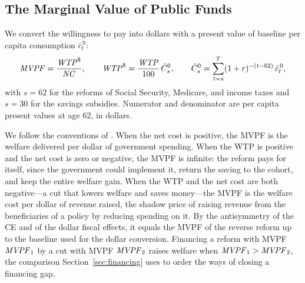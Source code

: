 \subsection{The Marginal Value of Public Funds}\label{sec:fw_mvpf}

We convert the willingness to pay into dollars with a present value of baseline per capita consumption $\bar c^{\,0}_{t}$:
\begin{equation}\label{eq:mvpf}
\mathit{MVPF}=\frac{\mathit{WTP}^{\$}}{\mathit{NC}},
\qquad
\mathit{WTP}^{\$}=\frac{\mathit{WTP}}{100}\,\bar C^{0}_{s},
\qquad
\bar C^{0}_{s}=\sum_{t=s}^{T}(1+r)^{-(t-62)}\,\bar c^{\,0}_{t},
\end{equation}
with $s=62$ for the reforms of Social Security, Medicare, and income taxes and $s=30$ for the savings subsidies. Numerator and denominator are per capita present values at age 62, in dollars.

We follow the conventions of \citet{hendren2020unified}. When the net cost is positive, the MVPF is the welfare delivered per dollar of government spending. When the WTP is positive and the net cost is zero or negative, the MVPF is infinite: the reform pays for itself, since the government could implement it, return the saving to the cohort, and keep the entire welfare gain. When the WTP and the net cost are both negative---a cut that lowers welfare and saves money---the MVPF is the welfare cost per dollar of revenue raised, the shadow price of raising revenue from the beneficiaries of a policy by reducing spending on it. By the antisymmetry of the CE and of the dollar fiscal effects, it equals the MVPF of the reverse reform up to the baseline used for the dollar conversion. Financing a reform with MVPF $\mathit{MVPF}_1$ by a cut with MVPF $\mathit{MVPF}_2$ raises welfare when $\mathit{MVPF}_1>\mathit{MVPF}_2$, the comparison Section~\ref{sec:financing} uses to order the ways of closing a financing gap.


